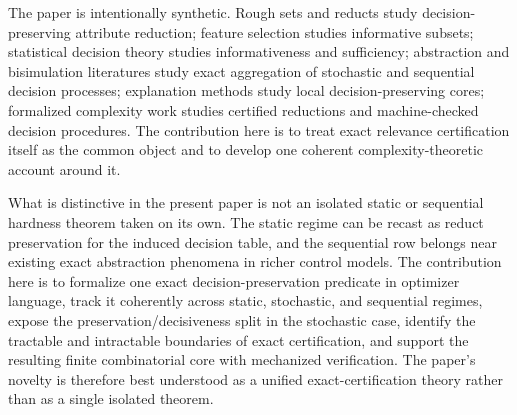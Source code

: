 The paper is intentionally synthetic. Rough sets and reducts study decision-preserving attribute reduction; feature selection studies informative subsets; statistical decision theory studies informativeness and sufficiency; abstraction and bisimulation literatures study exact aggregation of stochastic and sequential decision processes; explanation methods study local decision-preserving cores; formalized complexity work studies certified reductions and machine-checked decision procedures. The contribution here is to treat exact relevance certification itself as the common object and to develop one coherent complexity-theoretic account around it.

What is distinctive in the present paper is not an isolated static or sequential hardness theorem taken on its own. The static regime can be recast as reduct preservation for the induced decision table, and the sequential row belongs near existing exact abstraction phenomena in richer control models. The contribution here is to formalize one exact decision-preservation predicate in optimizer language, track it coherently across static, stochastic, and sequential regimes, expose the preservation/decisiveness split in the stochastic case, identify the tractable and intractable boundaries of exact certification, and support the resulting finite combinatorial core with mechanized verification. The paper's novelty is therefore best understood as a unified exact-certification theory rather than as a single isolated theorem.
